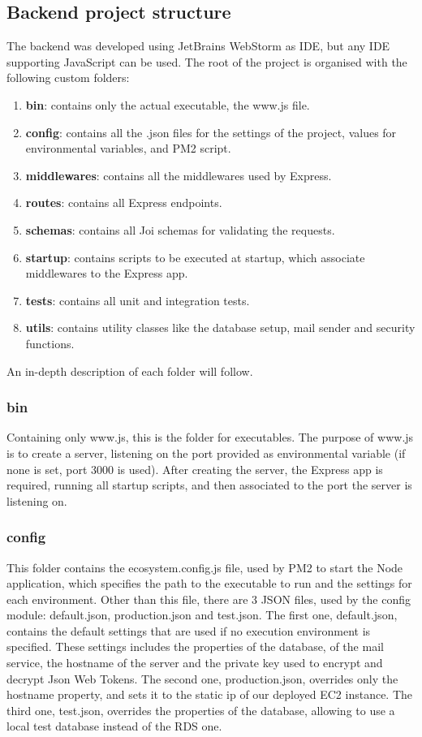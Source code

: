 \documentclass[titlepage]{article}
\begin{document}
	\subsection{Backend project structure}
	The backend was developed using JetBrains WebStorm as IDE, but any IDE supporting JavaScript can be used.
	The root of the project is organised with the following custom folders:
	\begin{enumerate}
		\item {\bf bin}: contains only the actual executable, the www.js file.
		\item {\bf config}: contains all the .json files for the settings of the project, values for environmental variables, and PM2 script.
		\item {\bf middlewares}: contains all the middlewares used by Express.
		\item {\bf routes}: contains all Express endpoints.
		\item {\bf schemas}: contains all Joi schemas for validating the requests.
		\item {\bf startup}: contains scripts to be executed at startup, which associate middlewares to the Express app.
		\item {\bf tests}: contains all unit and integration tests.
		\item {\bf utils}: contains utility classes like the database setup, mail sender and security functions.
	\end{enumerate}
	An in-depth description of each folder will follow.
	\subsubsection{bin}
	Containing only www.js, this is the folder for executables.
	The purpose of www.js is to create a server, listening on the port provided as environmental variable (if none is set, port 3000 is used). After creating the server, the Express app is required, running all startup scripts, and then associated to the port the server is listening on.
	\subsubsection{config}
	This folder contains the ecosystem.config.js file, used by PM2 to start the Node application, which specifies the path to the executable to run and the settings for each environment. Other than this file, there are 3 JSON files, used by the config module: default.json, production.json and test.json.
	The first one, default.json, contains the default settings that are used if no execution environment is specified. These settings includes the properties of the database, of the mail service, the hostname of the server and the private key used to encrypt and decrypt Json Web Tokens.
	The second one, production.json, overrides only the hostname property, and sets it to the static ip of our deployed EC2 instance.
	The third one, test.json, overrides the properties of the database, allowing to use a local test database instead of the RDS one.
	
\end{document}
